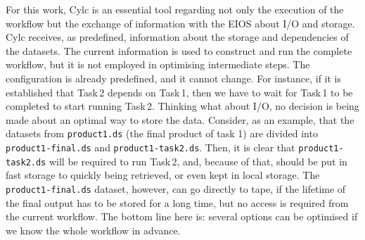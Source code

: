 \documentclass[a4paper]{article}
\begin{document}
For this work, Cylc is an essential tool regarding not only the execution of the workflow but the exchange of information with the EIOS about I/O and storage.
Cylc receives, as predefined, information about the storage and dependencies of the datasets. The current information is used to construct and run the complete workflow, but it is not employed in optimising intermediate steps.
The configuration is already predefined, and it cannot change. For instance, if it is established that Task\,2 depends on Task\,1, then we have to wait for Task\,1 to be completed to start running Task\,2.
Thinking what about I/O, no decision is being made about an optimal way to store the data.
Consider, as an example, that the datasets from \texttt{product1.ds} (the final product of task 1) are divided into \texttt{product1-final.ds} and \texttt{product1-task2.ds}. Then, it is clear that \texttt{product1-task2.ds} will be required to run Task\,2, and, because of that, should be put in fast storage to quickly being retrieved, or even kept in local storage. The \texttt{product1-final.ds} dataset, however, can go directly to tape, if the lifetime of the final output has to be stored for a long time, but no access is required from the current workflow.
The bottom line here is: several options can be optimised if we know the whole workflow in advance.
\end{document}
